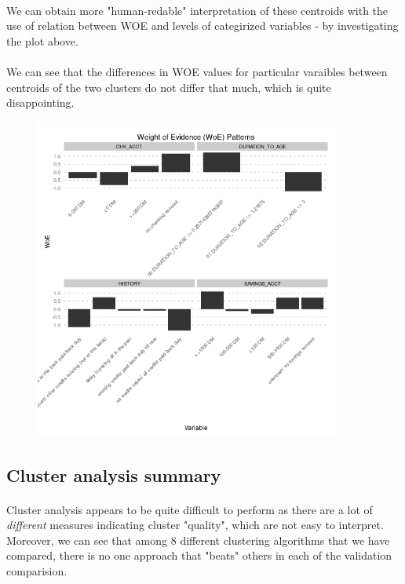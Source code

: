 \documentclass[10pt]{article}\usepackage[]{graphicx}\usepackage[]{color}
\begin{document}
\paragraph{}
We can obtain more "human-redable" interpretation of these centroids with the use of relation between WOE 
and levels of categirized variables - by investigating the plot above. 
\paragraph{}
We can see that the differences in WOE values for particular varaibles between centroids of the two clusters do not differ that much, which is quite disappointing. 


\begin{figure}[h!]
\centering
\includegraphics[width=0.90\textwidth]{Plots2/vars-woe.png}
\end{figure}


\clearpage
\subsection{Cluster analysis summary}
\paragraph{}
Cluster analysis appears to be quite difficult to perform as there are a lot of
\textit{different} measures indicating cluster "quality", which are
not easy to interpret. Moreover, we can see that among 8 different clustering
algorithms that we have compared, there is no one approach that "beats" others
in each of the validation comparision. 
\end{document}
